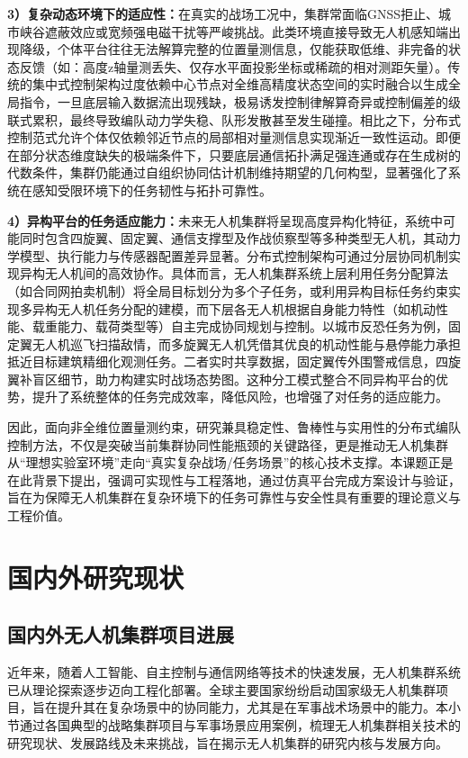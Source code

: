 \textbf{3）复杂动态环境下的适应性：}在真实的战场工况中，集群常面临GNSS拒止、城市峡谷遮蔽效应或宽频强电磁干扰等严峻挑战。此类环境直接导致无人机感知端出现降级，个体平台往往无法解算完整的位置量测信息，仅能获取低维、非完备的状态反馈（如：高度z轴量测丢失、仅存水平面投影坐标或稀疏的相对测距矢量）。传统的集中式控制架构过度依赖中心节点对全维高精度状态空间的实时融合以生成全局指令，一旦底层输入数据流出现残缺，极易诱发控制律解算奇异或控制偏差的级联式累积，最终导致编队动力学失稳、队形发散甚至发生碰撞。相比之下，分布式控制范式允许个体仅依赖邻近节点的局部相对量测信息实现渐近一致性运动。即便在部分状态维度缺失的极端条件下，只要底层通信拓扑满足强连通或存在生成树的代数条件，集群仍能通过自组织协同估计机制维持期望的几何构型，显著强化了系统在感知受限环境下的任务韧性与拓扑可靠性\cite{1014083939.nh}。

\textbf{4）异构平台的任务适应能力：}未来无人机集群将呈现高度异构化特征，系统中可能同时包含四旋翼、固定翼、通信支撑型及作战侦察型等多种类型无人机，其动力学模型、执行能力与传感器配置差异显著\cite{JSFY202504007}。分布式控制架构可通过分层协同机制实现异构无人机间的高效协作。具体而言，无人机集群系统上层利用任务分配算法（如合同网拍卖机制）将全局目标划分为多个子任务\cite{XTYD202111033}，或利用异构目标任务约束实现多异构无人机任务分配的建模\cite{QBZH202506006}，而下层各无人机根据自身能力特性（如机动性能、载重能力、载荷类型等）自主完成协同规划与控制。以城市反恐任务为例，固定翼无人机巡飞扫描敌情，而多旋翼无人机凭借其优良的机动性能与悬停能力承担抵近目标建筑精细化观测任务。二者实时共享数据，固定翼传外围警戒信息，四旋翼补盲区细节，助力构建实时战场态势图。这种分工模式整合不同异构平台的优势，提升了系统整体的任务完成效率，降低风险，也增强了对任务的适应能力\cite{YCYK202404001}。


因此，面向非全维位置量测约束，研究兼具稳定性、鲁棒性与实用性的分布式编队控制方法，不仅是突破当前集群协同性能瓶颈的关键路径，更是推动无人机集群从“理想实验室环境”走向“真实复杂战场/任务场景”的核心技术支撑。本课题正是在此背景下提出，强调可实现性与工程落地，通过仿真平台完成方案设计与验证，旨在为保障无人机集群在复杂环境下的任务可靠性与安全性具有重要的理论意义与工程价值。

\section{国内外研究现状}

\subsection{国内外无人机集群项目进展}
近年来，随着人工智能、自主控制与通信网络等技术的快速发展，无人机集群系统已从理论探索逐步迈向工程化部署。全球主要国家纷纷启动国家级无人机集群项目，旨在提升其在复杂场景中的协同能力，尤其是在军事战术场景中的能力。本小节通过各国典型的战略集群项目与军事场景应用案例，梳理无人机集群相关技术的研究现状、发展路线及未来挑战，旨在揭示无人机集群的研究内核与发展方向。

